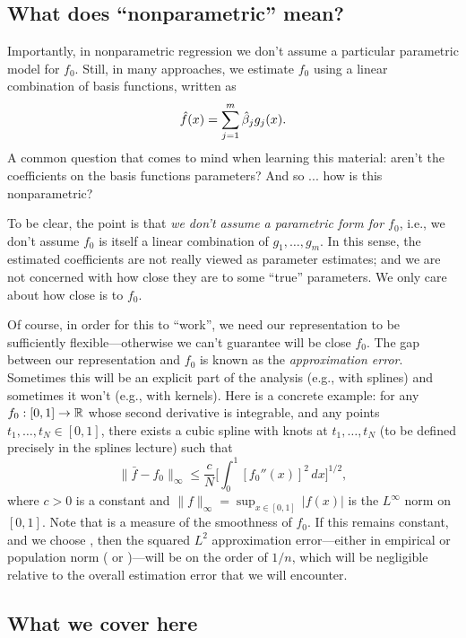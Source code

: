 \documentclass{article}
\begin{document}
\subsection{What does ``nonparametric'' mean?}

Importantly, in nonparametric regression we don't assume a particular parametric
model for $f_0$. Still, in many approaches, we estimate $f_0$ using a linear
combination of basis functions, written as   
\[
\hat{f}(x) = \sum_{j=1}^m \hat{\beta}_j g_j(x). 
\]
A common question that comes to mind when learning this material: aren't the
coefficients on the basis functions parameters? And so ... how is this
nonparametric?      

To be clear, the point is that \emph{we don't assume a parametric form for
  $f_0$}, i.e., we don't assume $f_0$ is itself a linear combination of
$g_1,\dots,g_m$. In this sense, the estimated coefficients
 are not really viewed as parameter estimates; 
and we are not concerned with how close they are to some ``true'' parameters. We 
only care about how close \smash{$\hf$} is to $f_0$.

Of course, in order for this to ``work'', we need our representation to be
sufficiently flexible---otherwise we can't guarantee \smash{$\hf$} will be close 
$f_0$. The gap between our representation and $f_0$ is known as the
\emph{approximation error}. Sometimes this will be an explicit part of the
analysis (e.g., with splines) and sometimes it won't (e.g., with kernels). Here
is a concrete example: for any $f_0 : [0,1] \to \mathbb{R}$ whose second derivative is
integrable, and any points $t_1,\dots,t_N \in [0,1]$, there exists a cubic
spline  with knots at $t_1,\dots,t_N$ (to be defined precisely
in the splines lecture) such that
\[
\|\bar{f} - f_0\|_\infty \leq \frac{c}{N} \bigg[ \int_0^1 [f_0''(x)]^2 \, dx
\bigg]^{1/2},  
\]
where $c>0$ is a constant and $\|f\|_\infty = \sup_{x \in [0,1]} \, |f(x)|$ is
the $L^\infty$ norm on $[0,1]$. Note that 
is a measure of the smoothness of $f_0$. If this remains constant, and we choose 
, then the squared $L^2$ approximation error---either in 
empirical or population norm ( or
)---will be on the order of $1/n$, which will be  
negligible relative to the overall estimation error that we will encounter.

\subsection{What we cover here}
\end{document}
